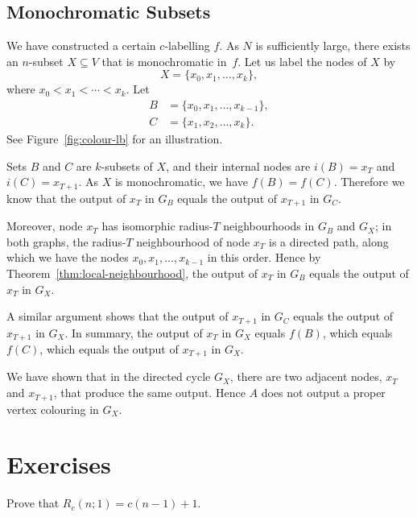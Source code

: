 \subsection{Monochromatic Subsets}

We have constructed a certain $c$-labelling $f$. As $N$ is sufficiently large, there exists an $n$-subset $X \subseteq V$ that is monochromatic in~$f$. Let us label the nodes of $X$ by
\[
    X = \{ x_0, x_1, \dotsc, x_k \},
\]
where $x_0 < x_1 < \dotsb < x_k$. Let
\begin{align*}
    B &= \{ x_0,x_1,\dotsc,x_{k-1} \}, \\
    C &= \{ x_1,x_2,\dotsc,x_k \}.
\end{align*}
See Figure~\ref{fig:colour-lb} for an illustration.

Sets $B$ and $C$ are $k$-subsets of $X$, and their internal nodes are $i(B) = x_{T}$ and $i(C) = x_{T+1}$. As $X$ is monochromatic, we have $f(B) = f(C)$. Therefore we know that the output of $x_{T}$ in $G_B$ equals the output of $x_{T+1}$ in $G_C$.

Moreover, node $x_{T}$ has isomorphic radius-$T$ neighbourhoods in $G_B$ and $G_X$; in both graphs, the radius-$T$ neighbourhood of node $x_{T}$ is a directed path, along which we have the nodes $x_0,x_1,\dotsc,\allowbreak x_{k-1}$ in this order. Hence by Theorem~\ref{thm:local-neighbourhood}, the output of $x_{T}$ in $G_B$ equals the output of $x_{T}$ in $G_X$.

A similar argument shows that the output of $x_{T+1}$ in $G_C$ equals the output of $x_{T+1}$ in $G_X$. In summary, the output of $x_{T}$ in $G_X$ equals $f(B)$, which equals $f(C)$, which equals the output of $x_{T+1}$ in $G_X$.

We have shown that in the directed cycle $G_X$, there are two adjacent nodes, $x_T$ and $x_{T+1}$, that produce the same output. Hence $A$ does not output a proper vertex colouring in $G_X$.


\section{Exercises}

\begin{ex}
    Prove that $R_c(n;1) = c(n-1)+1$.
    
\end{ex}

